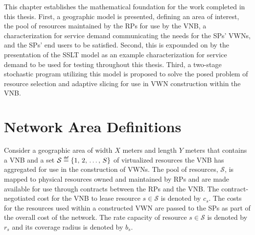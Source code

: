 \documentclass[12pt,dvipsnames]{report}
\newcommand\defeq{\mathrel{\overset{\makebox[0pt]{\mbox{\normalfont\tiny\sffamily def}}}{=}}}
\begin{document}
This chapter establishes the mathematical foundation for the work completed in this thesis.  First, a geographic model is presented, defining an area of interest, the pool of resources maintained by the RPs for use by the VNB, a characterization for service demand communicating the needs for the SPs' VWNs, and the SPs' end users to be satisfied.  Second, this is expounded on by the presentation of the SSLT model as an example characterization for service demand to be used for testing throughout this thesis.  Third, a two-stage stochastic program utilizing this model is proposed to solve the posed problem of resource selection and adaptive slicing for use in VWN construction within the VNB.

\section{Network Area Definitions} \label{sec:networkdefs}

Consider a geographic area of width $X$ meters and length $Y$ meters that contains a VNB and a set $\mathcal{S} \defeq \left\{1,\, 2,\, \ldots,\, S\right\}$ of virtualized resources the VNB has aggregated for use in the construction of VWNs.  The pool of resources, $\mathcal{S}$, is mapped to physical resources owned and maintained by RPs and are made available for use through contracts between the RPs and the VNB.  The contract-negotiated cost for the VNB to lease resource $s \in \mathcal{S}$ is denoted by $c_s$.  The costs for the resources used within a constructed VWN are passed to the SPs as part of the overall cost of the network.  The rate capacity of resource $s \in \mathcal{S}$ is denoted by $r_s$ and its coverage radius is denoted by $b_s$.
\end{document}
